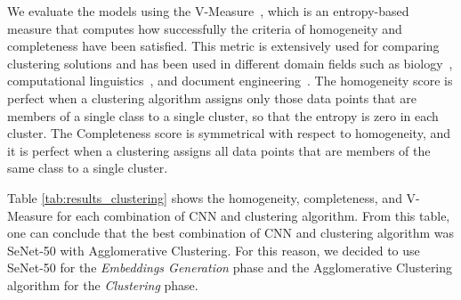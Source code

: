 We evaluate the models using the V-Measure~\cite{vmeasure}, which is an entropy-based measure that computes how successfully the criteria of homogeneity and completeness have been satisfied. This metric is extensively used for comparing clustering solutions and has been used in different domain fields such as biology~\cite{bio1}, computational linguistics~\cite{nlp1}, and document engineering~\cite{doceng}.
The homogeneity score is perfect when a clustering algorithm assigns only those data points that are members of a single class to a single cluster, so that the entropy is zero in each cluster. The Completeness score is symmetrical with respect to homogeneity, and it is perfect when a clustering assigns all data points that are members of the same class to a single cluster.

Table \ref{tab:results_clustering} shows the homogeneity, completeness, and V-Measure for each combination of CNN and clustering algorithm.
From this table, one can conclude that the best combination of CNN and clustering algorithm was SeNet-50 with Agglomerative Clustering.
For this reason, we decided to use SeNet-50 for the \emph{Embeddings Generation} phase and the Agglomerative Clustering algorithm for the \emph{Clustering} phase.


